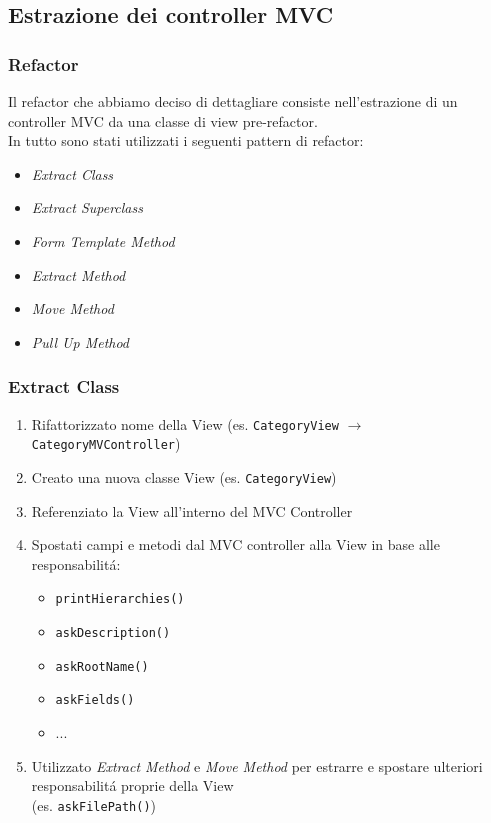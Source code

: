 \subsection{Estrazione dei controller MVC}
\beamertitle

\begin{frame}
    \frametitle{Refactor}
    Il refactor che abbiamo deciso di dettagliare consiste nell'estrazione di
    un controller MVC da una classe di view pre-refactor.
    \\
    \medskip
    In tutto sono stati utilizzati i seguenti pattern di refactor:
    \begin{itemize}
        \item \emph{Extract Class}
        \item \emph{Extract Superclass}
        \item \emph{Form Template Method}
        \item \emph{Extract Method}
        \item \emph{Move Method}
        \item \emph{Pull Up Method}
    \end{itemize}
\end{frame}

\begin{frame}
    \frametitle{Extract Class}
    \begin{enumerate}
        \item Rifattorizzato nome della View (es. \texttt{CategoryView} $\to$ \texttt{CategoryMVController})
        \item Creato una nuova classe View (es. \texttt{CategoryView})
        \item Referenziato la View all'interno del MVC Controller
        \item Spostati campi e metodi dal MVC controller alla View in base alle responsabilitá:
          \begin{itemize}
              \item \texttt{printHierarchies()}
              \item \texttt{askDescription()}
              \item \texttt{askRootName()}
              \item \texttt{askFields()}
              \item ...
          \end{itemize}
        \item Utilizzato \emph{Extract Method} e \emph{Move Method} per estrarre e spostare ulteriori responsabilitá proprie della View
              \\(es. \texttt{askFilePath()})
    \end{enumerate}
\end{frame}

